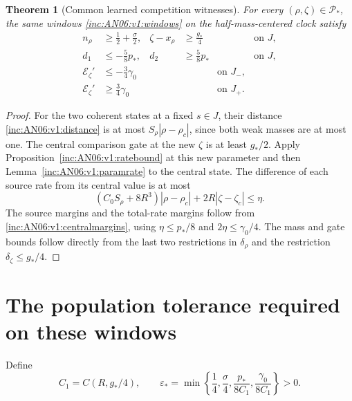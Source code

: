 \documentclass[11pt]{article}
\numberwithin{equation}{section}
\newtheorem{theorem}{Theorem}[section]
\theoremstyle{remark}\newtheorem{remark}[theorem]{Remark}
\newcommand{\1}{\mathbf 1}
\begin{document}
\begin{theorem}[Common learned competition witnesses]
\label{inc:AN06:v1:uniformtheorem}
For every $(\rho,\zeta)\in\mathcal P_*$, the \emph{same} windows
\eqref{inc:AN06:v1:windows} on the half-mass-centered clock satisfy
\begin{align}
 n_\rho&\ge\tfrac12+\tfrac\sigma2,
 &\zeta-x_\rho&\ge\tfrac{g_*}{4} &&\text{on }J,\nonumber\\
 d_1&\le-\tfrac58p_*,& d_2&\ge\tfrac58p_* &&\text{on }J,
 \label{inc:AN06:v1:uniformmargins}\\
 \mathcal E_\zeta'&\le-\tfrac34\gamma_0&&&\text{on }J_-,\nonumber\\
 \mathcal E_\zeta'&\ge\tfrac34\gamma_0&&&\text{on }J_+.\nonumber
\end{align}
\end{theorem}
\begin{proof}
For the two coherent states at a fixed $s\in J$, their distance
\eqref{inc:AN06:v1:distance} is at most $S_\rho|\rho-\rho_c|$,
since both weak masses are at most one.
The central comparison gate at the new $\zeta$ is at least $g_*/2$.
Apply Proposition~\ref{inc:AN06:v1:ratebound} at this new parameter and
then Lemma~\ref{inc:AN06:v1:paramrate} to the central state. The difference
of each source rate from its central value is at most
\[
 (C_0S_\rho+8R^3)|\rho-\rho_c|+2R|\zeta-\zeta_c|\le\eta.
\]
The source margins and the total-rate margins follow from
\eqref{inc:AN06:v1:centralmargins}, using
$\eta\le p_*/8$ and $2\eta\le\gamma_0/4$.
The mass and gate bounds follow directly from the last two restrictions
in $\delta_\rho$ and the restriction $\delta_\zeta\le g_*/4$.
\end{proof}

\section{The population tolerance required on these windows}
\label{inc:AN06:v1:tolerance}
Define
\begin{equation}\label{inc:AN06:v1:epsdef}
 C_1=C(R,g_*/4),\qquad
 \varepsilon_*=
 \min\left\{\frac14,\frac\sigma4,\frac{p_*}{8C_1},
                         \frac{\gamma_0}{8C_1}\right\}>0.
\end{equation}
\end{document}

